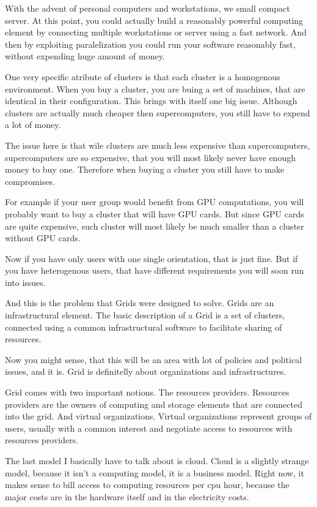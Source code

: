 \documentclass[10pt]{article}
\begin{document}
With the advent of personal computers and workstations, we small compact server.
At this point, you could actually build a reasonably powerful computing element
by connecting multiple workstations or server using a fast network. And then by
exploiting paralelization you could run your software reasonably fast, without
expending huge amount of money.

One very specific atribute of clusters is that each cluster is a homogenous
environment. When you buy a cluster, you are buing a set of machines, that are
identical in their configuration. This brings with itself one big issue.
Although clusters are actually much cheaper then supercomputers, you still have
to expend a lot of money.

The issue here is that wile clusters are much less expensive than
supercomputers, supercomputers are so expensive, that you will most likely
never have enough money to buy one. Therefore when buying a cluster you still
have to make compromises.

For example if your user group would benefit from GPU computations, you will
probably want to buy a cluster that will have GPU cards. But since GPU cards
are quite expensive, such cluster will most likely be much smaller than a
cluster without GPU cards.

Now if you have only users with one single orientation, that is just fine. But
if you have heterogenous users, that have different requirements you will soon
run into issues.

And this is the problem that Grids were designed to solve. Grids are an
infrastructural element.  The basic description of a Grid is a set of clusters,
connected using a common infrastructural software to facilitate sharing of
resources.

Now you might sense, that this will be an area with lot of policies and
political issues, and it is. Grid is definitelly about organizations and
infrastructures.

Grid comes with two important notions. The resources providers. Resources
providers are the owners of computing and storage elements that are connected
into the grid.  And virtual organizations. Virtual organizations represent
groups of users, usually with a common interest and negotiate access to
resources with resources providers.

The last model I basically have to talk about is cloud.
Cloud is a slightly strange model, because it isn't a computing model, it is a
business model. Right now, it makes sense to bill access to computing resources
per cpu hour, because the major costs are in the hardware itself and in the
electricity costs.
\end{document}
